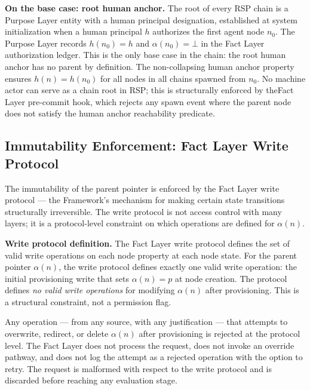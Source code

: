 \begin{note}
\textbf{On the base case: root human anchor.} The root of every RSP chain is a Purpose Layer entity with a human principal designation, established at system initialization when a human principal $h$ authorizes the first agent node $n_0$. The Purpose Layer records $h(n_0) = h$ and $\alpha(n_0) = \bot$ in the Fact Layer authorization ledger. This is the only base case in the chain: the root human anchor has no parent by definition. The non-collapsing human anchor property ensures $h(n) = h(n_0)$ for all nodes in all chains spawned from $n_0$. No machine actor can serve as a chain root in RSP; this is structurally enforced by theFact Layer pre-commit hook, which rejects any spawn event where the parent node does not satisfy the human anchor reachability predicate.
\end{note}

\subsection{Immutability Enforcement: Fact Layer Write Protocol}
\label{sec:fact-layer-immutability-enforcement}

The immutability of the parent pointer is enforced by the Fact Layer write protocol — the \bxthree{} Framework's mechanism for making certain state transitions structurally irreversible. The write protocol is not access control with many layers; it is a protocol-level constraint on which operations are defined for $\alpha(n)$.

\medskip
\noindent\textbf{Write protocol definition.} The Fact Layer write protocol defines the set of valid write operations on each node property at each node state. For the parent pointer $\alpha(n)$, the write protocol defines exactly one valid write operation: the initial provisioning write that sets $\alpha(n) = p$ at node creation. The protocol defines \emph{no valid write operations} for modifying $\alpha(n)$ after provisioning. This is a structural constraint, not a permission flag.

Any operation — from any source, with any justification — that attempts to overwrite, redirect, or delete $\alpha(n)$ after provisioning is rejected at the protocol level. The Fact Layer does not process the request, does not invoke an override pathway, and does not log the attempt as a rejected operation with the option to retry. The request is malformed with respect to the write protocol and is discarded before reaching any evaluation stage.

